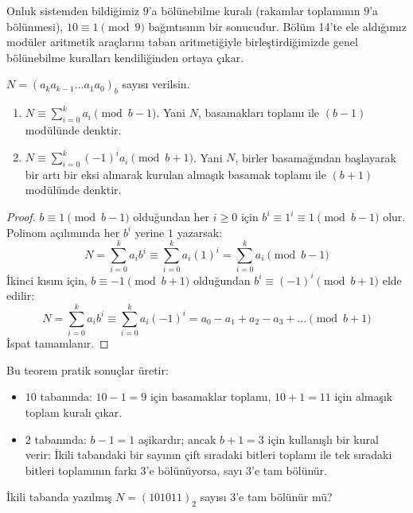 Onluk sistemden bildiğimiz $9$'a bölünebilme kuralı (rakamlar toplamının $9$'a bölünmesi), $10 \equiv 1 \pmod 9$ bağıntısının bir sonucudur. Bölüm 14'te ele aldığımız modüler aritmetik araçlarını taban aritmetiğiyle birleştirdiğimizde genel bölünebilme kuralları kendiliğinden ortaya çıkar.

\begin{theorem}
$N = (a_k a_{k-1} \dots a_1 a_0)_b$ sayısı verilsin.
\begin{enumerate}
    \item $N \equiv \sum_{i=0}^k a_i \pmod{b-1}$. Yani $N$, basamakları toplamı ile $(b-1)$ modülünde denktir.
    \item $N \equiv \sum_{i=0}^k (-1)^i a_i \pmod{b+1}$. Yani $N$, birler basamağından başlayarak bir artı bir eksi alınarak kurulan almaşık basamak toplamı ile $(b+1)$ modülünde denktir.
\end{enumerate}
\end{theorem}

\begin{proof}
$b \equiv 1 \pmod{b-1}$ olduğundan her $i \ge 0$ için $b^i \equiv 1^i \equiv 1 \pmod{b-1}$ olur. Polinom açılımında her $b^i$ yerine $1$ yazarsak:
\[
N = \sum_{i=0}^k a_i b^i \equiv \sum_{i=0}^k a_i (1)^i = \sum_{i=0}^k a_i \pmod{b-1}
\]
İkinci kısım için, $b \equiv -1 \pmod{b+1}$ olduğundan $b^i \equiv (-1)^i \pmod{b+1}$ elde edilir:
\[
N = \sum_{i=0}^k a_i b^i \equiv \sum_{i=0}^k a_i (-1)^i = a_0 - a_1 + a_2 - a_3 + \dots \pmod{b+1}
\]
İspat tamamlanır.
\end{proof}

Bu teorem pratik sonuçlar üretir:
\begin{itemize}
    \item $10$ tabanında: $10-1 = 9$ için basamaklar toplamı, $10+1 = 11$ için almaşık toplam kuralı çıkar.
    \item $2$ tabanında: $b-1 = 1$ aşikardır; ancak $b+1 = 3$ için kullanışlı bir kural verir: İkili tabandaki bir sayının çift sıradaki bitleri toplamı ile tek sıradaki bitleri toplamının farkı $3$'e bölünüyorsa, sayı $3$'e tam bölünür.
\end{itemize}

\begin{example}
İkili tabanda yazılmış $N = (101011)_2$ sayısı $3$'e tam bölünür mü?
\end{example}

